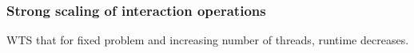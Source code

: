 \subsubsection{Strong scaling of interaction operations}
\bgroup\color{red}
WTS that for fixed problem and increasing number of threads, runtime decreases.
\egroup


